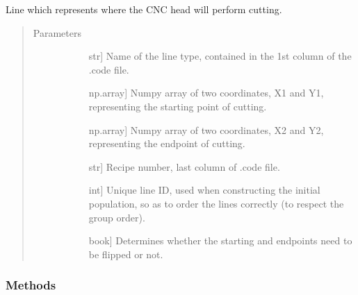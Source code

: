 \documentclass[letterpaper,10pt,english,openany,oneside]{sphinxmanual}
\begin{document}
\begin{fulllineitems}
\label{\detokenize{reference:cnc.optimization.Line}}
Line which represents where the CNC head will perform cutting.
\begin{quote}\begin{description}
\item[{Parameters}] \leavevmode\begin{description}
\item[{}] \leavevmode{[}str{]}
Name of the line type, contained in the 1st column of the .code
file.

\item[{}] \leavevmode{[}np.array{]}
Numpy array of two coordinates, X1 and Y1, representing the
starting point of cutting.

\item[{}] \leavevmode{[}np.array{]}
Numpy array of two coordinates, X2 and Y2, representing the
endpoint of cutting.

\item[{}] \leavevmode{[}str{]}
Recipe number, last column of .code file.

\item[{}] \leavevmode{[}int{]}
Unique line ID, used when constructing the initial population, so as to
order the lines correctly (to respect the group order).

\item[{}] \leavevmode{[}book{]}
Determines whether the starting and endpoints need to be flipped or not.

\end{description}

\end{description}\end{quote}
\subsubsection*{Methods}


\begin{savenotes}\sphinxatlongtablestart\begin{longtable}{}
\hline


\end{longtable}
\end{savenotes}
\end{fulllineitems}
\end{document}
